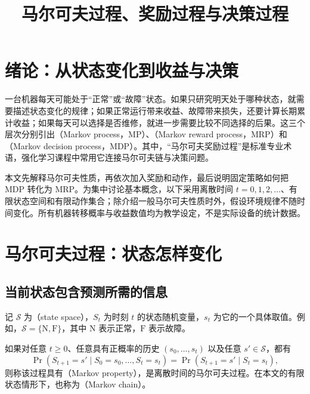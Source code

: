 \documentclass[UTF8]{ctexart}
\title{马尔可夫过程、奖励过程与决策过程}
\author{}
\date{}
\begin{document}
\maketitle

\section{绪论：从状态变化到收益与决策}
\label{sec:markov-three-intro}

一台机器每天可能处于“正常”或“故障”状态。如果只研究明天处于哪种状态，就需要描述状态变化的规律；如果正常运行带来收益、故障带来损失，还要计算长期累计收益；如果每天可以选择是否维修，就进一步需要比较不同选择的后果。这三个层次分别引出（Markov process，MP）、（Markov reward process，MRP）和（Markov decision process，MDP）。其中，“马尔可夫奖励过程”是标准专业术语，强化学习课程中常用它连接马尔可夫链与决策问题。

本文先解释马尔可夫性质，再依次加入奖励和动作，最后说明固定策略如何把 MDP 转化为 MRP。为集中讨论基本概念，以下采用离散时间 $t=0,1,2,\ldots$、有限状态空间和有限动作集合；除介绍一般马尔可夫性质时外，假设环境规律不随时间变化。所有机器转移概率与收益数值均为教学设定，不是实际设备的统计数据。

\section{马尔可夫过程：状态怎样变化}
\label{sec:markov-three-mp}

\subsection{当前状态包含预测所需的信息}

记 $\mathcal S$ 为（state space），$S_t$ 为时刻 $t$ 的状态随机变量，$s_t$ 为它的一个具体取值。例如，$\mathcal S=\{\mathrm N,\mathrm F\}$，其中 $\mathrm N$ 表示正常，$\mathrm F$ 表示故障。

\begin{definition}[离散时间的马尔可夫性质]
如果对任意 $t\geq0$、任意具有正概率的历史 $(s_0,\ldots,s_t)$ 以及任意 $s'\in\mathcal S$，都有
\begin{equation}
  \Pr(S_{t+1}=s'\mid S_0=s_0,\ldots,S_t=s_t)
  =\Pr(S_{t+1}=s'\mid S_t=s_t),
  \label{eq:markov-three-property}
\end{equation}
则称该过程具有（Markov property），是离散时间的马尔可夫过程。在本文的有限状态情形下，也称为（Markov chain）。
\end{definition}
\end{document}
